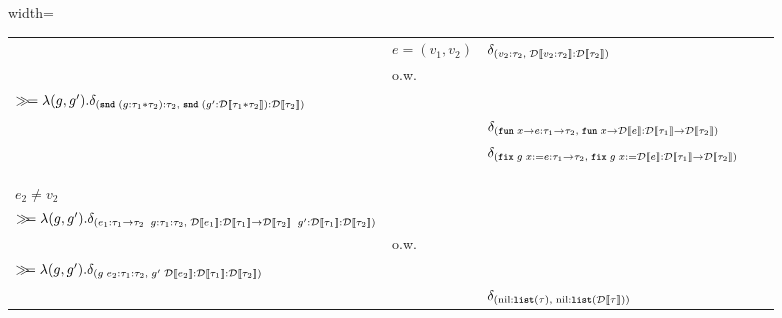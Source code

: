 \begin{table}[t]
\begin{center}
\begin{adjustbox}{width=\textwidth}
\begin{tabular}{l l l l l}
			\midrule
			\multirow{2}{*}{\makecell{$\sndkw\; (e : \tau_1 * \tau_2) : \tau_2$}}
			& $e = (v_1, v_2)$ & $\delta_{(v_2 : \tau_2,\; \mathcal{D}\llbracket v_2:\tau_2 \rrbracket : \mathcal{D}\llbracket \tau_2 \rrbracket)}$ \\
			& o.w.\ &
			\makecell[l]{$\sem{ e : \tau_1 * \tau_2, \discretize{e} : \discretize{\tau_1 * \tau_2}}$ \\
			$\gg\!= \lambda (g,g'). \delta_{(\textnormal{\ttfamily\bfseries snd}\; (g: \tau_1 * \tau_2) : \tau_2,\; \textnormal{\ttfamily\bfseries snd}\; (g' : \mathcal{D}\llbracket \tau_1 * \tau_2 \rrbracket) : \mathcal{D}\llbracket \tau_2 \rrbracket)}$} \\
			\midrule
			\multirow{1}{*}{\makecell{$\funkw \; x \to e : \tau_1 \to \tau_2$}}
			& & $\delta_{(\textnormal{\ttfamily\bfseries fun} \; x \to e : \tau_1 \to \tau_2,\; \textnormal{\ttfamily\bfseries fun} \; x \to \mathcal{D}\llbracket e \rrbracket : \mathcal{D}\llbracket \tau_1 \rrbracket \to \mathcal{D}\llbracket \tau_2 \rrbracket)}$ \\
			\midrule
			\multirow{1}{*}{\makecell{$\fixkw \; g\; x := e : \tau_1 \to \tau_2$}}
			& & $\delta_{(\textnormal{\ttfamily\bfseries fix} \; g\; x := e : \tau_1 \to \tau_2,\; \textnormal{\ttfamily\bfseries fix} \; g\; x := \mathcal{D}\llbracket e \rrbracket : \mathcal{D}\llbracket \tau_1 \rrbracket \to \mathcal{D}\llbracket \tau_2 \rrbracket)}$ \\
			\midrule
			\multirow{3}{*}{\makecell{$(e_1 : \tau_1 \to \tau_2\;\; e_2 : \tau_1) : \tau_2$}}
			& \makecell[l]{$e_1 = \funkw\; x \to e \text{ or } \fixkw\; f\; x := e,$\\ $e_2 = v_2$} &
			\makecell[l]{$\dirac{(e[v_2/x] : \tau_2,\; \discretize{e}[\discretize{v_2} / x] : \discretize{\tau_2})}$} \\
			& \makecell[l]{$e_1 = \funkw\; x \to e \text{ or } \fixkw\; f\; x := e,$\\ $e_2 \neq v_2$} &
			\makecell[l]{$\sem{ e_2 : \tau_1, \discretize{e_2 : \tau_1} : \discretize{\tau_1}}$ \\
			$\gg\!\!= \lambda (g,g'). \delta_{( e_1 : \tau_1 \to \tau_2\;\; g : \tau_1 : \tau_2,\; \mathcal{D}\llbracket e_1 \rrbracket : \mathcal{D}\llbracket \tau_1 \rrbracket \to \mathcal{D}\llbracket \tau_2 \rrbracket\;\; g' : \mathcal{D}\llbracket \tau_1 \rrbracket : \mathcal{D}\llbracket \tau_2 \rrbracket)}$} \\
			& o.w.\ &
			\makecell[l]{$\sem{ e_1 : \tau_1 \to \tau_2, \discretize{e_1} : \discretize{\tau_1 \to \tau_2}}$ \\
			$\gg\!\!= \lambda (g,g'). \delta_{( g\; e_2 : \tau_1 : \tau_2,\; g'\; \mathcal{D}\llbracket e_2 \rrbracket : \mathcal{D}\llbracket \tau_1 \rrbracket : \mathcal{D}\llbracket \tau_2 \rrbracket)}$} \\
			\midrule
			\multirow{1}{*}{\makecell{$\text{nil} : \listty{\tau}$}}
			& & $\delta_{(\text{nil} : \textnormal{\ttfamily\bfseries list}(\tau),\; \text{nil} : \textnormal{\ttfamily\bfseries list}(\mathcal{D}\llbracket \tau \rrbracket))}$ \\

\end{tabular}
\end{adjustbox}
\end{center}
\end{table}
